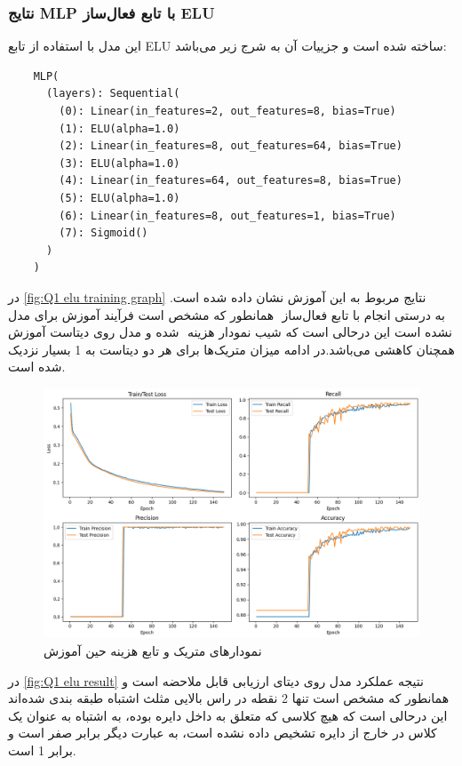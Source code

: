\documentclass{article}
\begin{document}
\subsubsection{نتایج MLP با تابع فعال‌ساز ELU}

این مدل با استفاده از تابع ELU ساخته شده است و جزییات آن به شرج زیر می‌باشد:

\begin{LTR}
\begin{verbatim}
	MLP(
	  (layers): Sequential(
	    (0): Linear(in_features=2, out_features=8, bias=True)
	    (1): ELU(alpha=1.0)
	    (2): Linear(in_features=8, out_features=64, bias=True)
	    (3): ELU(alpha=1.0)
	    (4): Linear(in_features=64, out_features=8, bias=True)
	    (5): ELU(alpha=1.0)
	    (6): Linear(in_features=8, out_features=1, bias=True)
	    (7): Sigmoid()
	  )
	)
\end{verbatim}
\end{LTR}

در ‎‎\autoref{fig:Q1 elu training graph}‎ نتایج مربوط به این آموزش نشان داده شده است. همانطور که مشخص است فرآیند آموزش برای مدل ‎ با تابع فعال‌ساز ‎به درستی انجام شده و مدل روی دیتاست آموزش ‎ نشده است این درحالی است که شیب نمودار هزینه همچنان کاهشی می‌باشد.در ادامه میزان متریک‌ها برای هر دو دیتاست به 1 بسیار نزدیک شده است.

\begin{figure}[H]
    \centering
    \includegraphics[width=0.7\linewidth]{img/Q1_elu_metrics_graph.png}
    \caption{نمودارهای متریک و تابع هزینه حین آموزش}
    \label{fig:Q1 elu training graph}
\end{figure}

در ‎\autoref{fig:Q1 elu result}‎ نتیجه عملکرد مدل روی دیتای ارزیابی قابل ملاحضه است و همانطور که مشخص است تنها 2 نقطه در راس بالایی مثلث اشتباه طبقه بندی شده‌اند این درحالی است که هیچ کلاسی که متعلق به داخل دایره بوده، به اشتباه به عنوان یک کلاس در خارج از دایره تشخیص داده نشده است، به عبارت دیگر
 برابر صفر است و   برابر 1 است.
 
\end{document}
